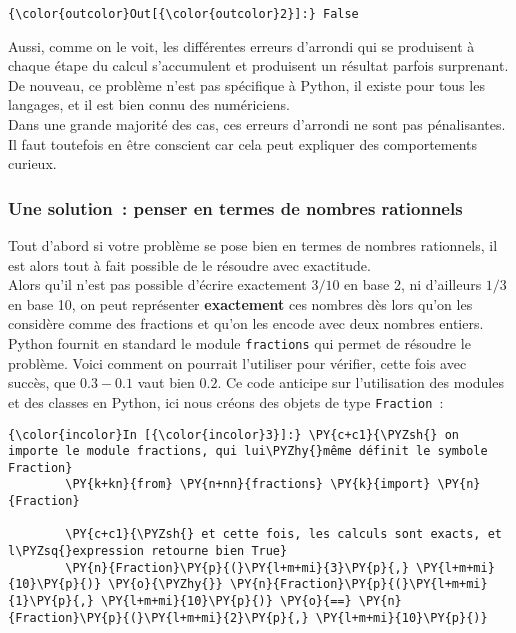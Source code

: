 \begin{Verbatim}[commandchars=\\\{\}]
{\color{outcolor}Out[{\color{outcolor}2}]:} False
\end{Verbatim}
            
    Aussi, comme on le voit, les différentes erreurs d'arrondi qui se
produisent à chaque étape du calcul s'accumulent et produisent un
résultat parfois surprenant. De nouveau, ce problème n'est pas
spécifique à Python, il existe pour tous les langages, et il est bien
connu des numériciens.\\

    Dans une grande majorité des cas, ces erreurs d'arrondi ne sont pas
pénalisantes. Il faut toutefois en être conscient car cela peut
expliquer des comportements curieux.

    \hypertarget{une-solution-penser-en-termes-de-nombres-rationnels}{%
\subsubsection{Une solution~: penser en termes de nombres
rationnels}\label{une-solution-penser-en-termes-de-nombres-rationnels}}

    Tout d'abord si votre problème se pose bien en termes de nombres
rationnels, il est alors tout à fait possible de le résoudre avec
exactitude.\\

    Alors qu'il n'est pas possible d'écrire exactement \(3/10\) en base 2,
ni d'ailleurs \(1/3\) en base 10, on peut représenter
\textbf{exactement} ces nombres dès lors qu'on les considère comme des
fractions et qu'on les encode avec deux nombres entiers.\\

    Python fournit en standard le module \texttt{fractions} qui permet de
résoudre le problème. Voici comment on pourrait l'utiliser pour
vérifier, cette fois avec succès, que \(0.3 - 0.1\) vaut bien \(0.2\).
Ce code anticipe sur l'utilisation des modules et des classes en Python,
ici nous créons des objets de type \texttt{Fraction}~:

    \begin{Verbatim}[commandchars=\\\{\}]
{\color{incolor}In [{\color{incolor}3}]:} \PY{c+c1}{\PYZsh{} on importe le module fractions, qui lui\PYZhy{}même définit le symbole Fraction}
        \PY{k+kn}{from} \PY{n+nn}{fractions} \PY{k}{import} \PY{n}{Fraction}
        
        \PY{c+c1}{\PYZsh{} et cette fois, les calculs sont exacts, et l\PYZsq{}expression retourne bien True}
        \PY{n}{Fraction}\PY{p}{(}\PY{l+m+mi}{3}\PY{p}{,} \PY{l+m+mi}{10}\PY{p}{)} \PY{o}{\PYZhy{}} \PY{n}{Fraction}\PY{p}{(}\PY{l+m+mi}{1}\PY{p}{,} \PY{l+m+mi}{10}\PY{p}{)} \PY{o}{==} \PY{n}{Fraction}\PY{p}{(}\PY{l+m+mi}{2}\PY{p}{,} \PY{l+m+mi}{10}\PY{p}{)}
\end{Verbatim}


